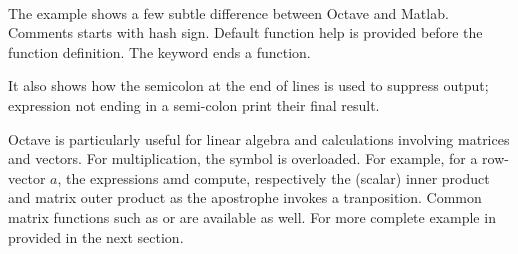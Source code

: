 {\hlstd{}\hlstd{\ \ }\hlstd{}\hspace*{\fill}\\
\hlstd{}\hlstd{\ \ }\hlopt{=\ }\hlopt{{-}\ }\hlopt{{*}}\hlstd{}\hlstd{}\hlopt{;}\hspace*{\fill}\\
\hlstd{\hspace*{\fill}\\
}\hlstd{\ \ }\hlopt{=\ }\hlopt{+\ }\hlopt{/}\hlstd{}\hlstd{}\hlopt{;}\hspace*{\fill}\\
\hlstd{}\hlstd{\ \ }\hlstd{}\hlstd{}\hlopt{(}\hlstd{}\hlstd{}\hlopt{,}\hspace*{\fill}\\
\hlstd{}\hlstd{\ \ \ \ \ \ \ \ \ }\hlopt{,\ }\hlopt{,\ }\hlopt{,\ }\hlopt{,\ }\hlopt{);}\hspace*{\fill}\\
\hlstd{}\hlstd{}\hspace*{\fill}\\
\mbox{}
\normalfont
\normalsize


}

The example shows a few subtle difference between Octave and Matlab. Comments
starts with hash sign. Default function help is provided before the function
definition. The  keyword ends a function.

It also shows how the semicolon at the end of lines is used to suppress
output; expression not ending in a semi-colon print their final result.



Octave is particularly useful for linear algebra and calculations involving
matrices and vectors.  For multiplication, the \code{*} symbol is
overloaded. For example, for a row-vector $a$, the expressions 
amd  compute, respectively the (scalar) inner product and matrix
outer product as the apostrophe invokes a tranposition. Common matrix
functions such as  or  are available as well.  For more
complete example in provided in the next section.

